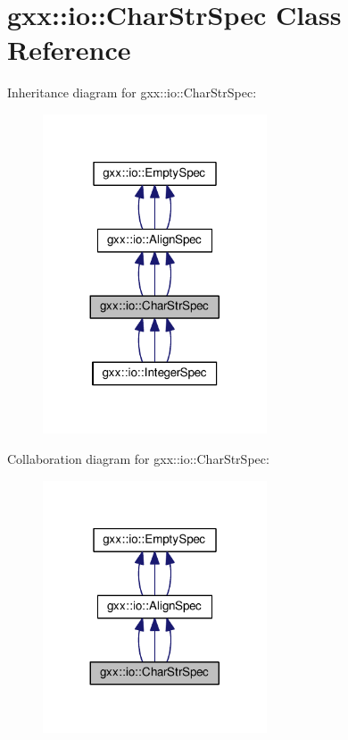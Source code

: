 \hypertarget{classgxx_1_1io_1_1CharStrSpec}{}\section{gxx\+:\+:io\+:\+:Char\+Str\+Spec Class Reference}
\label{classgxx_1_1io_1_1CharStrSpec}


Inheritance diagram for gxx\+:\+:io\+:\+:Char\+Str\+Spec\+:
\nopagebreak
\begin{figure}[H]
\begin{center}
\leavevmode
\includegraphics[width=188pt]{classgxx_1_1io_1_1CharStrSpec__inherit__graph}
\end{center}
\end{figure}


Collaboration diagram for gxx\+:\+:io\+:\+:Char\+Str\+Spec\+:
\nopagebreak
\begin{figure}[H]
\begin{center}
\leavevmode
\includegraphics[width=188pt]{classgxx_1_1io_1_1CharStrSpec__coll__graph}
\end{center}
\end{figure}
